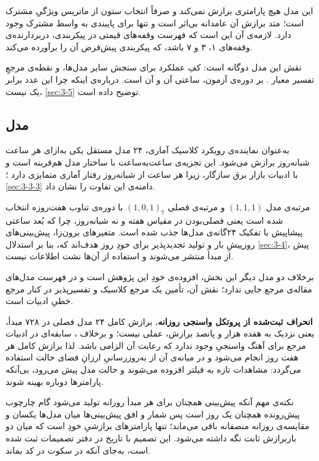 این مدل هیچ پارامتری برازش نمی‌کند و صرفاً انتخاب ستون از ماتریس ویژگیِ مشترک است؛
متد برازش آن عامدانه بی‌اثر است و تنها برای پایبندی به واسط مشترک وجود دارد. لازمه‌ی
آن این است که فهرست وقفه‌های قیمتی در پیکربندی، دربردارنده‌ی وقفه‌های ۱، ۳ و ۷ باشد،
که پیکربندی پیش‌فرض آن را برآورده می‌کند.

نقش این مدل دوگانه است: کفِ عملکرد برای سنجش سایر مدل‌ها، و نقطه‌ی مرجعِ تفسیر معیار
. بر دوره‌ی آزمون،  ساعتی آن  و  آن 
است. درباره‌ی اینکه چرا این عدد برابر یک نیست، \cref{sec:3-5} توضیح داده است.

\subsection*{مدل }

به‌عنوان نماینده‌ی رویکرد کلاسیک آماری، ۲۴ مدل  مستقل  یکی به‌ازای
هر ساعت شبانه‌روز  برازش می‌شود. این تجزیه‌ی ساعت‌به‌ساعت با ساختار مدل
 هم‌قرینه است و با ادبیات بازار برق سازگار، زیرا هر ساعت از شبانه‌روز
رفتار آماری متمایزی دارد \cite{jiang_review_2018}؛ \cref{sec:3-3-3} دامنه‌ی این تفاوت را
نشان داد.

مرتبه‌ی مدل $(1,1,1)$ و مرتبه‌ی فصلی $(1,0,1)_{7}$ با دوره‌ی تناوب هفت‌روزه انتخاب شده
است  یعنی فصلی‌بودن در مقیاس هفته و نه شبانه‌روز، چرا که بُعد ساعتی پیشاپیش با
تفکیک ۲۴گانه‌ی مدل‌ها جذب شده است. متغیرهای برون‌زا، پیش‌بینی‌های روزپیشِ بار و تولید
تجدیدپذیر برای خودِ روز هدف‌اند که، بنا بر استدلال \cref{sec:3-4}، پیش از مبدأ منتشر
می‌شوند و استفاده از آن‌ها نشت اطلاعات نیست.

برخلاف دو مدل دیگر این بخش،  افزوده‌ی خودِ این پژوهش است و در فهرست
مدل‌های مقاله‌ی مرجع جایی ندارد؛ نقش آن، تأمین یک مرجع کلاسیک و تفسیرپذیر در کنار
مرجع خطیِ ادبیات است.

\textbf{انحراف ثبت‌شده از پروتکل واسنجی روزانه.} برازش کامل ۲۴ مدل فصلی در ۷۲۸ مبدأ،
یعنی نزدیک به هفده هزار و پانصد برازش، عملی نیست؛ و برخلاف ، سابقه‌ای در
ادبیات مرجع برای آهنگ واسنجیِ  وجود ندارد که رعایت آن الزامی باشد. لذا
برازش کامل هر هفت روز انجام می‌شود و در میانه‌ی آن از به‌روزرسانیِ ارزانِ فضای حالت
استفاده می‌گردد: مشاهدات تازه به فیلتر افزوده می‌شوند و حالت مدل پیش می‌رود،
بی‌آنکه پارامترها دوباره بهینه شوند.

نکته‌ی مهم آنکه پیش‌بینی همچنان برای هر مبدأ روزانه تولید می‌شود  گام چارچوب
پیش‌رونده همچنان یک روز است  پس شمار و افق پیش‌بینی‌ها میان مدل‌ها یکسان و
مقایسه‌ی روزانه منصفانه باقی می‌ماند؛ تنها پارامترهای برازشیِ خودِ  است که
میان دو بازبرازش ثابت نگه داشته می‌شود. این تصمیم با تاریخ در دفتر تصمیمات ثبت شده
است، به‌جای آنکه در سکوت در کد بماند.

